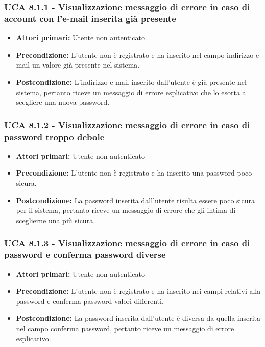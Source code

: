 \subsubsection{UCA 8.1.1 - Visualizzazione messaggio di errore in caso di account con l'e-mail inserita già presente}%
\begin{itemize}
\item \textbf{Attori primari:} Utente non autenticato
\item \textbf{Precondizione:} L'utente non è registrato e ha inserito nel campo indirizzo e-mail un valore già presente nel sistema.
\item \textbf{Postcondizione:} L'indirizzo e-mail inserito dall'utente è già presente nel sistema, pertanto riceve un messaggio di errore esplicativo che lo esorta a scegliere una nuova password.
\end{itemize}

\subsubsection{UCA 8.1.2 - Visualizzazione messaggio di errore in caso di password troppo debole}%
\begin{itemize}
\item \textbf{Attori primari:} Utente non autenticato
\item \textbf{Precondizione:} L'utente non è registrato e ha inserito una password poco sicura.
\item \textbf{Postcondizione:} La password inserita dall'utente risulta essere poco sicura per il sistema, pertanto riceve un messaggio di errore che gli intima di sceglierne una più sicura.
\end{itemize}

\subsubsection{UCA 8.1.3 - Visualizzazione messaggio di errore in caso di password e conferma password diverse}%
\begin{itemize}
\item \textbf{Attori primari:} Utente non autenticato
\item \textbf{Precondizione:} L'utente non è registrato e ha inserito nei campi relativi alla password e conferma password valori differenti.
\item \textbf{Postcondizione:} La password inserita dall'utente è diversa da quella inserita nel campo conferma password, pertanto riceve un messaggio di errore esplicativo.
\end{itemize}

